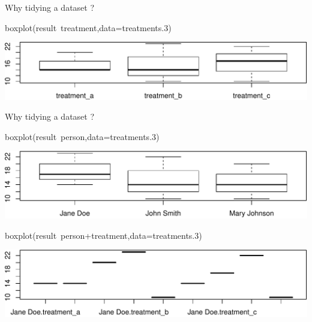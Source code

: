 \documentclass[14pt,ignorenonframetext,]{bredelebeamer}
\newenvironment{Shaded}{\begin{snugshade}}{\end{snugshade}}
\newcommand{\KeywordTok}[1]{\textcolor[rgb]{0.94,0.87,0.69}{#1}}
\newcommand{\DataTypeTok}[1]{\textcolor[rgb]{0.87,0.87,0.75}{#1}}
\newcommand{\DecValTok}[1]{\textcolor[rgb]{0.86,0.86,0.80}{#1}}
\newcommand{\OperatorTok}[1]{\textcolor[rgb]{0.94,0.94,0.82}{#1}}
\newcommand{\NormalTok}[1]{\textcolor[rgb]{0.80,0.80,0.80}{#1}}
\begin{document}
\begin{frame}[fragile]{Why tidying a dataset ?}
\begin{Shaded}
\begin{Highlighting}[]
\KeywordTok{boxplot}\NormalTok{(result}\OperatorTok{~}\NormalTok{treatment,}\DataTypeTok{data=}\NormalTok{treatments.}\DecValTok{3}\NormalTok{)}
\end{Highlighting}
\end{Shaded}

\includegraphics{tidyverse_28_03_files/figure-beamer/boxplot3-1.pdf}

\end{frame}

\begin{frame}[fragile]{Why tidying a dataset ?}

\begin{Shaded}
\begin{Highlighting}[]
\KeywordTok{boxplot}\NormalTok{(result}\OperatorTok{~}\NormalTok{person,}\DataTypeTok{data=}\NormalTok{treatments.}\DecValTok{3}\NormalTok{)}
\end{Highlighting}
\end{Shaded}

\includegraphics{tidyverse_28_03_files/figure-beamer/boxplot4-1.pdf}

\begin{Shaded}
\begin{Highlighting}[]
\KeywordTok{boxplot}\NormalTok{(result}\OperatorTok{~}\NormalTok{person}\OperatorTok{+}\NormalTok{treatment,}\DataTypeTok{data=}\NormalTok{treatments.}\DecValTok{3}\NormalTok{)}
\end{Highlighting}
\end{Shaded}

\includegraphics{tidyverse_28_03_files/figure-beamer/boxplot5-1.pdf}

\end{frame}
\end{document}
